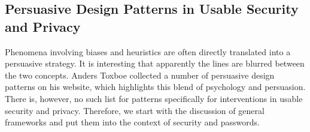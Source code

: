 


	\subsection{Persuasive Design Patterns in Usable Security and Privacy}
	Phenomena involving biases and heuristics are often directly translated into a persuasive strategy. It is interesting that apparently the lines are blurred between the two concepts. Anders Toxboe collected a number of persuasive design patterns on his website, which highlights this blend of psychology and persuasion. There is, however, no such list for patterns specifically for interventions in usable security and privacy. Therefore, we start with the discussion of general frameworks and put them into the context of security and passwords.
	
